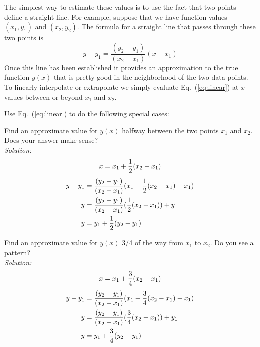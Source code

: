 The simplest way to estimate these values is to use the fact that two
points define a straight line. For example, suppose that we have
function values $(x_1,y_1)$ and $(x_2,y_2)$. The formula for a
straight line that passes through these two points is
\begin{equation} \label{eq:linear}
    y-y_1 = \frac{ (y_2-y_1) }{ (x_2-x_1) } (x-x_1)
\end{equation}
Once this line has been established it provides an approximation to
the true function $y(x)$ that is pretty good in the neighborhood of
the two data points. To linearly interpolate or extrapolate we simply
evaluate Eq.~(\ref{eq:linear}) at $x$ values between or beyond $x_1$
and $x_2$.

\begin{enumerate}
\probtwo \label{P:1.3} Use Eq.~(\ref{eq:linear}) to do the following
    special cases:

\begin{enumerate}
\subprob Find an approximate value for $y(x)$ halfway between
    the two points $x_1$ and $x_2$. Does your answer make
    sense?\\
\ifsolutions
\textit{Solution:}
\begin{equation}
x = x_1 + {1 \over 2} (x_2 - x_1)
\end{equation}
\begin{align}
    y-y_1 &= \frac{ (y_2-y_1) }{ (x_2-x_1) } (x_1 + {1 \over 2} (x_2 -
    x_1)-x_1)\\
y &= \frac{ (y_2-y_1) }{ (x_2-x_1) } ({1 \over 2} (x_2 -
x_1)) + y_1\\
y &= y_1 + {1 \over 2} (y_2-y_1) \\
\end{align}

\fi
\subprob Find an approximate value for $y(x)$ 3/4 of the way
    from $x_1$ to $x_2$. Do you see a pattern?\\
\ifsolutions
\textit{Solution:}
\begin{align}
x &= x_1 + {3\over 4}(x_2 - x_1)\\
\end{align}
\begin{align}
    y-y_1 &= \frac{ (y_2-y_1) }{ (x_2-x_1) } (x_1 + {3 \over 4} (x_2 -
    x_1)-x_1)\\
y &= \frac{ (y_2-y_1) }{ (x_2-x_1) } ({3 \over 4} (x_2 -
x_1)) + y_1\\
y &= y_1 + {3 \over 4} (y_2-y_1) \\
\end{align}


\end{enumerate}
\end{enumerate}
